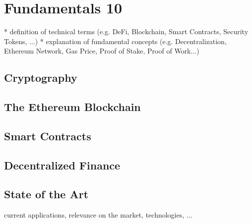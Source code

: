 \chapter{Fundamentals 10}
\label{cha:Fundamentals}

* definition of technical terms (e.g. DeFi, Blockchain, Smart Contracts, Security Tokens, ...)
* explanation of fundamental concepts (e.g. Decentralization, Ethereum Network, Gas Price, Proof of Stake, Proof of Work...)

\section{Cryptography}
\section{The Ethereum Blockchain}
\section{Smart Contracts}
\section{Decentralized Finance}
\section{State of the Art}
current applications, relevance on the market, technologies, ...